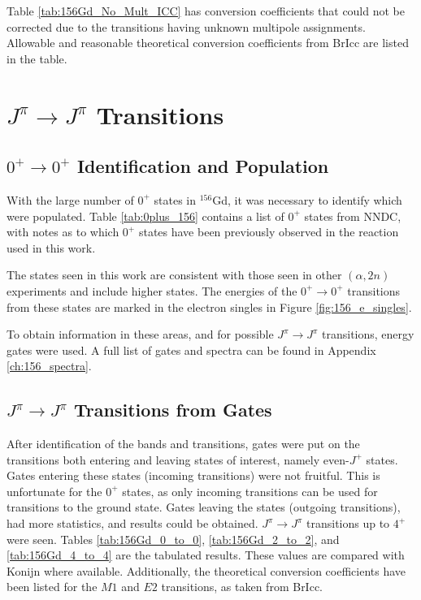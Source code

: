\afterpage{\clearpage}

Table \ref{tab:156Gd_No_Mult_ICC} has conversion coefficients that could not be corrected due to the transitions having unknown multipole assignments. Allowable and reasonable theoretical conversion coefficients from BrIcc\citep{kibedi08:_BRICC} are listed in the table.

\afterpage{\clearpage}

\section{$J^{\pi}\rightarrow J^{\pi}$ Transitions}

\subsection{$0^{+}\rightarrow 0^{+}$ Identification and Population}

With the large number of $0^+$ states in $^{156}$Gd, it was necessary to identify which were populated. Table \ref{tab:0plus_156} contains a list of $0^+$ states from NNDC, with notes as to which $0^+$ states have been previously observed in the reaction used in this work.



The states seen in this work are consistent with those seen in other $(\alpha,2n)$ experiments and include higher states. The energies of the $0^+\rightarrow0^+$ transitions from these states are marked in the electron singles in Figure \ref{fig:156_e_singles}.



To obtain information in these areas, and for possible $J^{\pi}\rightarrow J^{\pi}$ transitions, energy gates were used. A full list of gates and spectra can be found in Appendix \ref{ch:156_spectra}.

\subsection{$J^{\pi}\rightarrow J^{\pi}$ Transitions from Gates}

After identification of the bands and transitions, gates were put on the transitions both entering and leaving states of interest, namely even-$J^+$ states. Gates entering these states (incoming transitions) were not fruitful. This is unfortunate for the $0^+$ states, as only incoming transitions can be used for transitions to the ground state. Gates leaving the states (outgoing transitions), had more statistics, and results could be obtained. $J^\pi\rightarrow J^\pi$ transitions up to $4^+$ were seen. Tables \ref{tab:156Gd_0_to_0}, \ref{tab:156Gd_2_to_2}, and \ref{tab:156Gd_4_to_4} are the tabulated results. These values are compared with Konijn\citep{konijn81:_156gd} where available. Additionally, the theoretical conversion coefficients have been listed for the $M1$ and $E2$ transitions, as taken from BrIcc\citep{kibedi08:_BRICC}.

